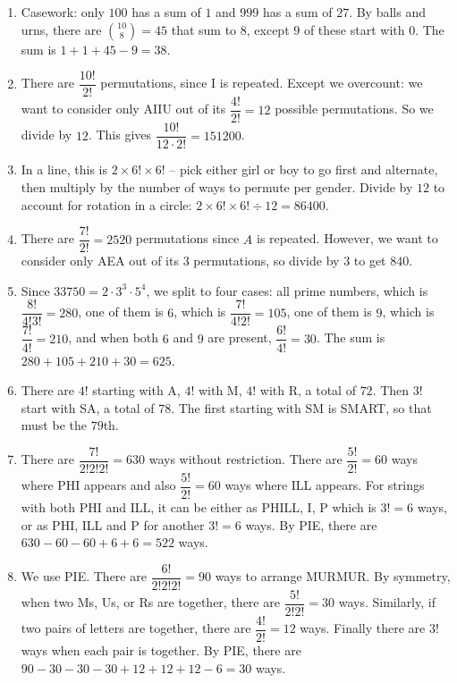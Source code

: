 \documentclass[10pt,paper=letter]{scrartcl}
\begin{document}
\begin{enumerate}

\item Casework: only $100$ has a sum of $1$ and $999$ has a sum of $27$. By balls and urns, there are $\binom{10}8 = 45$ that sum to $8$, except $9$ of these start with $0$. The sum is $1 + 1 + 45 - 9 = 38$.

\item There are $\dfrac{10!}{2!}$ permutations, since I is repeated. Except we overcount: we want to consider only AIIU out of its $\dfrac{4!}{2!} = 12$ possible permutations. So we divide by $12$. This gives $\dfrac{10!}{12 \cdot 2!} = 151200$.

\item In a line, this is $2 \times 6! \times 6!$ -- pick either girl or boy to go first and alternate, then multiply by the number of ways to permute per gender. Divide by $12$ to account for rotation in a circle: $2 \times 6! \times 6! \div 12 = 86400$.

\item There are $\dfrac{7!}{2!} = 2520$ permutations since $A$ is repeated. However, we want to consider only AEA out of its $3$ permutations, so divide by $3$ to get $840$.

\item Since $33750 = 2 \cdot 3^3 \cdot 5^4$, we split to four cases: all prime numbers, which is $\dfrac{8!}{4!3!} = 280$, one of them is $6$, which is $\dfrac{7!}{4!2!} = 105$, one of them is $9$, which is $\dfrac{7!}{4!} = 210$, and when both $6$ and $9$ are present, $\dfrac{6!}{4!} = 30$. The sum is $280 + 105 + 210 + 30 = 625$.

\item There are $4!$ starting with A, $4!$ with M, $4!$ with R, a total of $72$. Then $3!$ start with SA, a total of $78$. The first starting with SM is SMART, so that must be the $79$th.

\item There are $\dfrac{7!}{2!2!2!} = 630$ ways without restriction. There are $\dfrac{5!}{2!} = 60$ ways where PHI appears and also $\dfrac{5!}{2!} = 60$ ways where ILL appears. For strings with both PHI and ILL, it can be either as PHILL, I, P which is $3! = 6$ ways, or as PHI, ILL and P for another $3! = 6$ ways. By PIE, there are $630 - 60 - 60 +6 + 6 = 522$ ways.

\item We use PIE. There are $\dfrac{6!}{2!2!2!} = 90$ ways to arrange MURMUR. By symmetry, when two Ms, Us, or Rs are together, there are $\dfrac{5!}{2!2!} = 30$ ways. Similarly, if two pairs of letters are together, there are $\dfrac{4!}{2!} = 12$ ways. Finally there are $3!$ ways when each pair is together. By PIE, there are $90 - 30 - 30 - 30 + 12 + 12 + 12 - 6 = 30$ ways.

\end{enumerate}
\end{document}
